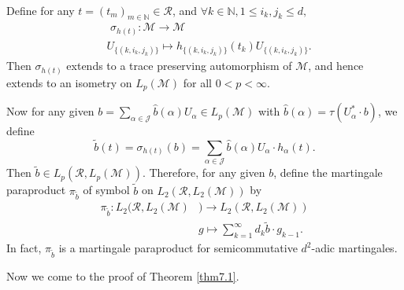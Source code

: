 \documentclass[oneside,english,a4wide]{amsart}
\numberwithin{equation}{section}
\numberwithin{figure}{section}
\theoremstyle{plain}
\theoremstyle{plain}
\theoremstyle{definition}
\theoremstyle{plain}
\theoremstyle{remark}
\theoremstyle{definition}
\theoremstyle{remark}
\theoremstyle{definition}
\newcommand{\8}{\infty}
\begin{document}
\

Define for any $t=(t_m)_{m\in\mathbb{N}}\in\mathcal{R}$, and $\forall k\in\mathbb{N}, 1\le i_k,j_k\le d,$
\begin{equation*}
	\begin{aligned}
		{}&\,\,\sigma_{h(t)}:\mathscr{M}\to \mathscr{M}\\&
		U_{\{(k,i_k,j_k)\}}\mapsto h_{\{(k,i_k,j_k)\}}(t_k)U_{\{(k,i_k,j_k)\}}.
	\end{aligned}
\end{equation*}
Then $\sigma_{h(t)}$ extends to a trace preserving automorphism of $\mathscr{M}$, and hence extends to an isometry on $L_p(\mathscr{M})$ for all $0< p< \infty$.

Now for any given $b=\sum\limits_{\alpha\in\mathcal{J}}\hat{b}(\alpha)U_\alpha\in L_p(\mathscr{M})$ with $\hat{b}(\alpha)=\tau(U_\alpha^*\cdot b)$, we define 
\[\tilde b(t)=\sigma_{h(t)}(b)=\sum_{\alpha\in\mathcal{J}}\hat{b}(\alpha)U_\alpha\cdot h_\alpha(t).\]
Then $\tilde{b}\in L_p(\mathcal{R},L_p(\mathscr{M}))$. Therefore, for any given $b$, define the martingale paraproduct $\pi_{\tilde{b}}$ of symbol $\tilde{b}$ on $L_2(\mathcal{R},L_2(\mathscr{M}))$ by
\begin{equation*}
	\begin{aligned}
		\pi_{\tilde{b}}:L_2(\mathcal{R},L_2(\mathscr{M}){}&)\to L_2(\mathcal{R},L_2(\mathscr{M}))\\&
		g\mapsto \sum_{k=1}^\infty d_k\tilde{b}\cdot g_{k-1}.
	\end{aligned}
\end{equation*}
In fact, $\pi_{\tilde{b}}$ is a martingale paraproduct for semicommutative $d^2$-adic martingales.

Now we come to the proof of Theorem \ref{thm7.1}.
\end{document}
